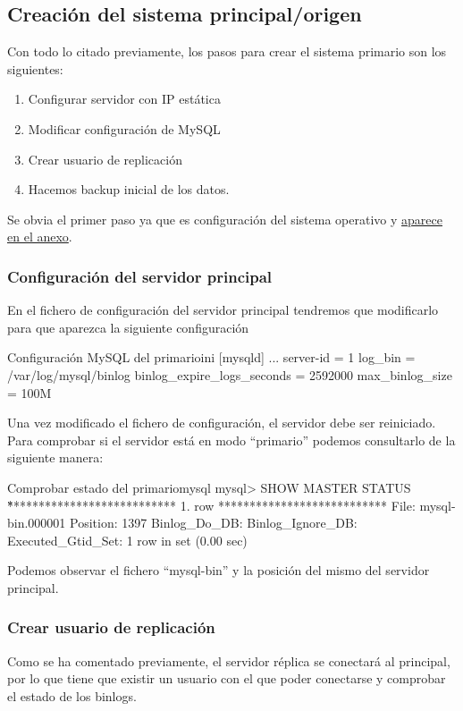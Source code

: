 \subsection{Creación del sistema principal/origen}
Con todo lo citado previamente, los pasos para crear el sistema primario son los siguientes:

\begin{enumerate}
    \item Configurar servidor con IP estática
    \item Modificar configuración de MySQL
    \item Crear usuario de replicación
    \item Hacemos backup inicial de los datos.
\end{enumerate}

Se obvia el primer paso ya que es configuración del sistema operativo y \hyperlink{configurar_ip_estatica_ubuntu}{aparece en el anexo}.


\subsubsection{Configuración del servidor principal}
En el fichero de configuración del servidor principal tendremos que modificarlo para que aparezca la siguiente configuración

\begin{mycode}{Configuración MySQL del primario}{ini}{}
[mysqld]
...
server-id = 1
log_bin = /var/log/mysql/binlog
binlog_expire_logs_seconds     = 2592000
max_binlog_size = 100M
\end{mycode}

Una vez modificado el fichero de configuración, el servidor debe ser reiniciado. Para comprobar si el servidor está en modo “primario” podemos consultarlo de la siguiente manera:


\begin{mycode}{Comprobar estado del primario}{mysql}{}
mysql> SHOW MASTER STATUS \G
*************************** 1. row ***************************
File: mysql-bin.000001
Position: 1397
Binlog_Do_DB:
Binlog_Ignore_DB:
Executed_Gtid_Set:
1 row in set (0.00 sec)
\end{mycode}

Podemos observar el fichero “mysql-bin” y la posición del mismo del servidor principal.


\subsubsection{Crear usuario de replicación}
Como se ha comentado previamente, el servidor réplica se conectará al principal, por lo que tiene que existir un usuario con el que poder conectarse y comprobar el estado de los binlogs.

